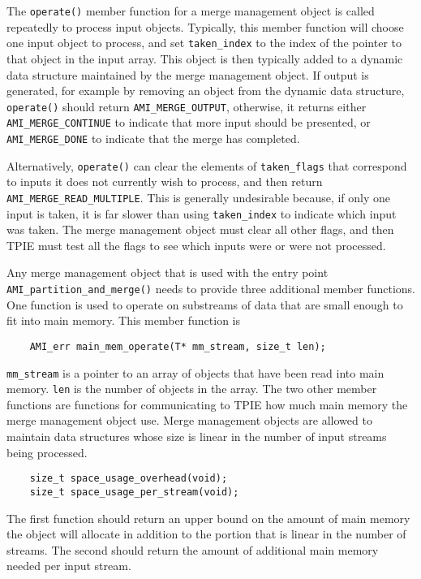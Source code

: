 The \verb|operate()| member function for a merge management object is
called repeatedly to process input objects.  Typically, this member
function will choose one input object to process, and set
\verb|taken_index| to the index of the pointer to that object in the input
array.  This object is then typically added to a dynamic data structure
maintained by the merge management object.  If output is generated, for
example by removing an object from the dynamic data structure,
\verb|operate()| should return \verb|AMI_MERGE_OUTPUT|, otherwise, it
returns either \verb|AMI_MERGE_CONTINUE| to indicate that more input should
be presented, or \verb|AMI_MERGE_DONE| to indicate that the merge has
completed.

Alternatively, \verb|operate()| can clear the elements of
\verb|taken_flags| that correspond to inputs it does not currently wish to
process, and then return \verb|AMI_MERGE_READ_MULTIPLE|.  This is generally
undesirable because, if only one input is taken, it is far slower than
using \verb|taken_index| to indicate which input was taken.  The merge
management object must clear all other flags, and then TPIE must test all
the flags to see which inputs were or were not processed.

Any merge management object that is used with the entry point
\verb|AMI_partition_and_merge()| needs to provide three additional member
functions. One function is used to operate on substreams of data that are
small enough to fit into main memory. This member function is
\begin{verbatim}
    AMI_err main_mem_operate(T* mm_stream, size_t len);
\end{verbatim}
\verb|mm_stream| is a pointer to an array of objects that have been read
into main memory. \verb|len| is the number of objects in the array. The two
other member functions are functions for communicating to TPIE how much
main memory the merge management object use. Merge management objects are
allowed to maintain data structures whose size is linear in the number of
input streams being processed.
\begin{verbatim}
    size_t space_usage_overhead(void);
    size_t space_usage_per_stream(void);
\end{verbatim}
The first function should return an upper bound on the amount of main
memory the object will allocate in addition to the
portion that is linear in the number of streams. The second should return
the amount of additional main memory needed per input stream.

